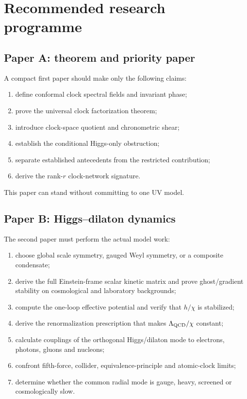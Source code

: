 \documentclass[11pt,a4paper]{article}
\begin{document}
\section{Recommended research programme}

\subsection{Paper A: theorem and priority paper}

A compact first paper should make only the following claims:

\begin{enumerate}
  \item define conformal clock spectral fields and invariant phase;
  \item prove the universal clock factorization theorem;
  \item introduce clock-space quotient and chronometric shear;
  \item establish the conditional Higgs-only obstruction;
  \item separate established antecedents from the restricted contribution;
  \item derive the rank-$r$ clock-network signature.
\end{enumerate}

This paper can stand without committing to one UV model.

\subsection{Paper B: Higgs--dilaton dynamics}

The second paper must perform the actual model work:

\begin{enumerate}
  \item choose global scale symmetry, gauged Weyl symmetry, or a composite condensate;
  \item derive the full Einstein-frame scalar kinetic matrix and prove ghost/gradient stability on cosmological and laboratory backgrounds;
  \item compute the one-loop effective potential and verify that $h/\chi$ is stabilized;
  \item derive the renormalization prescription that makes $\Lambda_{\rm QCD}/\chi$ constant;
  \item calculate couplings of the orthogonal Higgs/dilaton mode to electrons, photons, gluons and nucleons;
  \item confront fifth-force, collider, equivalence-principle and atomic-clock limits;
  \item determine whether the common radial mode is gauge, heavy, screened or cosmologically slow.
\end{enumerate}
\end{document}
